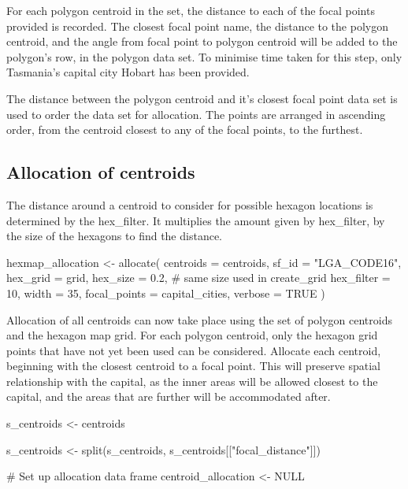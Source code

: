 For each polygon centroid in the set, the distance to each of the focal
points provided is recorded. The closest focal point name, the distance
to the polygon centroid, and the angle from focal point to polygon
centroid will be added to the polygon's row, in the polygon data set. To
minimise time taken for this step, only Tasmania's capital city Hobart
has been provided.

The distance between the polygon centroid and it's closest focal point
data set is used to order the data set for allocation. The points are
arranged in ascending order, from the centroid closest to any of the
focal points, to the furthest.

\hypertarget{allocation-of-centroids}{%
\subsection{Allocation of centroids}\label{allocation-of-centroids}}

The distance around a centroid to consider for possible hexagon
locations is determined by the hex\_filter. It multiplies the amount
given by hex\_filter, by the size of the hexagons to find the distance.

\begin{Schunk}
\begin{Sinput}
hexmap_allocation <- allocate(
  centroids = centroids,
  sf_id = "LGA_CODE16",
  hex_grid = grid,
  hex_size = 0.2, # same size used in create_grid
  hex_filter = 10,
  width = 35,
  focal_points = capital_cities,
  verbose = TRUE
)
\end{Sinput}
\end{Schunk}

Allocation of all centroids can now take place using the set of polygon
centroids and the hexagon map grid. For each polygon centroid, only the
hexagon grid points that have not yet been used can be considered.
Allocate each centroid, beginning with the closest centroid to a focal
point. This will preserve spatial relationship with the capital, as the
inner areas will be allowed closest to the capital, and the areas that
are further will be accommodated after.

\begin{Schunk}
\begin{Sinput}
s_centroids <- centroids %

s_centroids <- split(s_centroids, s_centroids[["focal_distance"]])
        
# Set up allocation data frame
centroid_allocation <- NULL
\end{Sinput}
\end{Schunk}


